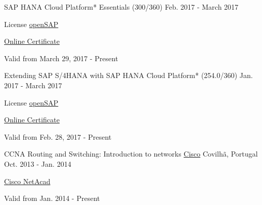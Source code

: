 \begin{cventries}
  \cventry
    {SAP HANA Cloud Platform* Essentials (300/360)} %
    {} %
    {} %
    {Feb. 2017 - March 2017} %
    {
	    \begin{cvitems} %
        \item {License \href{https://open.sap.com/}{openSAP}} %
        \item {\href{https://open.sap.com/verify/xulor-nynoz-soped-muvuv-zitek}{Online Certificate}} %
        \item {Valid from March 29, 2017 - Present} %
      \end{cvitems}
    }        
    
  \cventry
    {Extending SAP S/4HANA with SAP HANA Cloud Platform* (254.0/360)} %
    {} %
    {} %
    {Jan. 2017 - March 2017} %
    {
	    \begin{cvitems} %
        \item {License \href{https://open.sap.com/}{openSAP}} %
        \item {\href{https://open.sap.com/verify/xugal-vaseb-firih-zadyd-deniv}{Online Certificate}} %
        \item {Valid from Feb. 28, 2017 - Present} %
      \end{cvitems}
    }
   
  \cventry
    {CCNA Routing and Switching: Introduction to networks} %
    {\href{https://www.cisco.com/}{Cisco}} %
    {Covilh\~a, Portugal} %
    {Oct. 2013 - Jan. 2014} %
    {
	    \begin{cvitems} %
        \item {\href{https://www.netacad.com/}{Cisco NetAcad}} %
        \item {Valid from Jan. 2014 - Present} %
      \end{cvitems}
    }

\end{cventries}